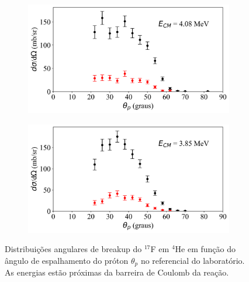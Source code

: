\documentclass[a4paper,12pt,oneside]{book}
\begin{document}
\begin{figure}[H]
\begin{subfigure}[b]{0.48\textwidth}
        \caption{}
        \label{subfig:dist_ang_j}
    \end{subfigure}%
    \hfill
    \begin{subfigure}[b]{0.49\textwidth}
        \centering
        \includegraphics[scale=0.38, width=1.\columnwidth]{figs/dist_angs/dist_ang_10.png}
        \caption{}
        \label{subfig:dist_ang_k}
    \end{subfigure}
    \begin{subfigure}[b]{0.48\textwidth}
        \centering
        \includegraphics[scale=0.38, width=1.\columnwidth]{figs/dist_angs/dist_ang_11.png}
        \caption{}
        \label{subfig:dist_ang_l}
    \end{subfigure}%
    \hfill
\caption{Distribuições angulares de breakup do $^{17}$F em $^4$He em função do ângulo de espalhamento do próton $\theta_p$ no referencial do laboratório. As energias estão próximas da barreira de Coulomb da reação.}
\label{fig:dist_ang_prox}
\end{figure}
\end{document}
